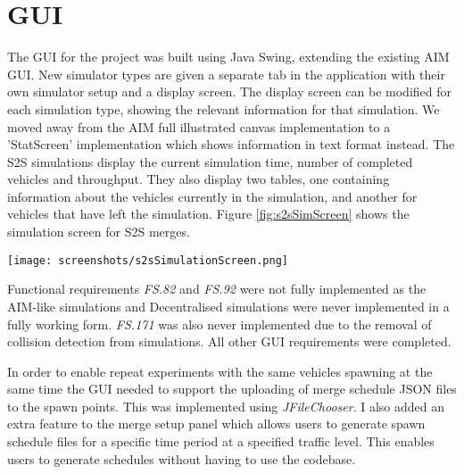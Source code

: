 \section{GUI}
\label{sec:GUI}
The GUI for the project was built using Java Swing, extending the existing AIM GUI. New simulator types are given a separate tab in the application with their own simulator setup and a display screen. The display screen can be modified for each simulation type, showing the relevant information for that simulation. We moved away from the AIM full illustrated canvas implementation to a 'StatScreen' implementation which shows information in text format instead. The S2S simulations display the current simulation time, number of completed vehicles and throughput. They also display two tables, one containing information about the vehicles currently in the simulation, and another for vehicles that have left the simulation. Figure \ref{fig:s2sSimScreen} shows the simulation screen for S2S merges.

\begin{sidewaysfigure}[p]
\texttt{[image: screenshots/s2sSimulationScreen.png]}
\caption{The simulation screen for the S2S merge screen}
\label{fig:s2sSimScreen}
\end{sidewaysfigure}

Functional requirements \emph{FS.82} and \emph{FS.92} were not fully implemented as the AIM-like simulations and Decentralised simulations were never implemented in a fully working form. \emph{FS.171} was also never implemented due to the removal of collision detection from simulations. All other GUI requirements were completed. 

In order to enable repeat experiments with the same vehicles spawning at the same time the GUI needed to support the uploading of merge schedule JSON files to the spawn points. This was implemented using \emph{JFileChooser}. I also added an extra feature to the merge setup panel which allows users to generate spawn schedule files for a specific time period at a specified traffic level. This enables users to generate schedules without having to use the codebase.

